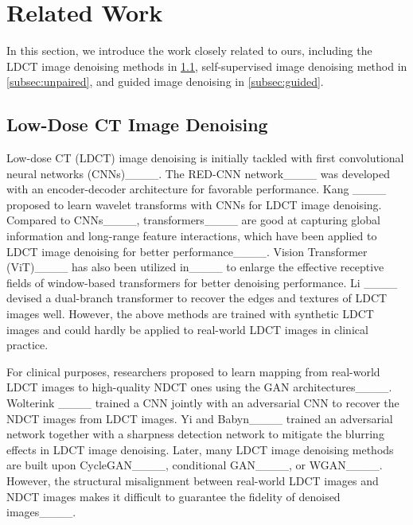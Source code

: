 \section{Related Work}
\label{sec:relatedwork}
In this section, we introduce the work closely related to ours, including the LDCT image denoising methods in \cref{subsec:LDCT reconstruction}, self-supervised image denoising method in \cref{subsec:unpaired}, and guided image denoising in \cref{subsec:guided}.


\subsection{Low-Dose CT Image Denoising}
\label{subsec:LDCT reconstruction}
Low-dose CT (LDCT) image denoising is initially tackled with first convolutional neural networks (CNNs)____. The RED-CNN network____ was developed with an encoder-decoder architecture for favorable performance. Kang \etal____ proposed to learn wavelet transforms with CNNs for LDCT image denoising.
%
Compared to CNNs____, transformers____ are good at capturing global information and long-range feature interactions, which have been applied to LDCT image denoising for better performance____. Vision Transformer (ViT)____ has also been utilized in____ to enlarge the effective receptive fields of window-based transformers for better denoising performance. Li \etal____ devised a dual-branch transformer to recover the edges and textures of LDCT images well.
However, the above methods are trained with synthetic LDCT images and could hardly be applied to real-world LDCT images in clinical practice.


For clinical purposes, researchers proposed to learn mapping from real-world LDCT images to high-quality NDCT ones using the GAN architectures____. Wolterink \etal____ trained a CNN jointly with an adversarial CNN to recover the NDCT images from LDCT images. Yi and Babyn____ trained an adversarial network together with a sharpness detection network to mitigate the blurring effects in LDCT image denoising. Later, many LDCT image denoising methods are built upon CycleGAN____, conditional GAN____, or WGAN____. However, the structural misalignment between real-world LDCT images and NDCT images makes it difficult to guarantee the fidelity of denoised images____.

